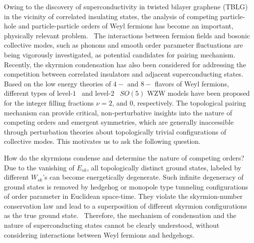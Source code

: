 \documentclass[aps,prb,amsmath,amssymb,floatfix,twocolumn]{revtex4}
\begin{document}
Owing to the discovery of superconductivity in twisted bilayer graphene (TBLG) in the vicinity of correlated insulating states, the analysis of competing particle-hole and particle-particle orders of Weyl fermions has become an  important, physically relevant problem.~\cite{Cao1,Taniguchi,Efetov1,Efetov2,Saito,Kerelsky,Choi,Jiang,Xie,Wong,Zondiner,LiuWang,Cao2} The interactions between fermion fields and bosonic collective modes, such as phonons and smooth order parameter fluctuations are being vigorously investigated, as potential candidates for pairing mechanism.~\cite{Wu,Isobe,Lian,You,Classen,Chubukov,Kozil,Fernandes2} Recently, the skyrmion condensation has also been considered for addressing the competition between correlated insulators and adjacent superconducting states.~\cite{Zaletel1,Christos,Zaletel2,Khalaf} Based on the low energy theories of $4-$ and $8-$ flavors of Weyl fermions, different types of level-$1$~\cite{Zaletel1} and level-$2$~\cite{Christos} $SO(5)$ WZW models have been proposed for the integer filling fractions $\nu=2$, and $0$, respectively. The topological pairing mechanism can provide critical, non-perturbative insights into the nature of competing orders and emergent symmetries, which are generally inaccessible through perturbation theories about topologically trivial configurations of collective modes. This motivates us to ask the following question. 

How do the skyrmions condense and determine the nature of competing orders? Due to the vanishing of $E_{sk}$, all topologically distinct ground states, labeled by different $W_{sk}$'s can become energetically degenerate. Such infinite degeneracy of ground states is removed by hedgehog or monopole type tunneling configurations of order parameter in Euclidean space-time. They violate the skyrmion-number conservation law and lead to a superposition of different skyrmion configurations as the true ground state.~\cite{Duncan,MurthySachdev,Read} Therefore, the mechanism of condensation and the nature of superconducting states cannot be clearly understood, without considering interactions between Weyl fermions and hedgehogs. 
\end{document}

